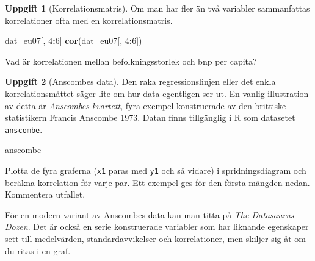 \documentclass[
]{book}
\newenvironment{Shaded}{\begin{snugshade}}{\end{snugshade}}
\newcommand{\DecValTok}[1]{\textcolor[rgb]{0.00,0.00,0.81}{#1}}
\newcommand{\FunctionTok}[1]{\textcolor[rgb]{0.13,0.29,0.53}{\textbf{#1}}}
\newcommand{\NormalTok}[1]{#1}
\newcommand{\SpecialCharTok}[1]{\textcolor[rgb]{0.81,0.36,0.00}{\textbf{#1}}}
\theoremstyle{definition}
\theoremstyle{definition}
\theoremstyle{definition}
\newtheorem{exercise}{Uppgift}[chapter]
\theoremstyle{definition}
\theoremstyle{remark}
\begin{document}
\begin{exercise}[Korrelationsmatris]
Om man har fler än två variabler sammanfattas korrelationer ofta med en korrelationsmatris.

\begin{Shaded}
\begin{Highlighting}[]
\NormalTok{dat\_eu07[, }\DecValTok{4}\SpecialCharTok{:}\DecValTok{6}\NormalTok{]}
\FunctionTok{cor}\NormalTok{(dat\_eu07[, }\DecValTok{4}\SpecialCharTok{:}\DecValTok{6}\NormalTok{])}
\end{Highlighting}
\end{Shaded}

Vad är korrelationen mellan befolkningsstorlek och bnp per capita?
\end{exercise}

\begin{exercise}[Anscombes data]

Den raka regressionslinjen eller det enkla korrelationsmåttet säger lite om hur data egentligen ser ut. En vanlig illustration av detta är \emph{Anscombes kvartett}, fyra exempel konstruerade av den brittiske statistikern Francis Anscombe 1973. Datan finns tillgänglig i R som datasetet \texttt{anscombe}.

\begin{Shaded}
\begin{Highlighting}[]
\NormalTok{anscombe}
\end{Highlighting}
\end{Shaded}

Plotta de fyra graferna (\texttt{x1} paras med \texttt{y1} och så vidare) i spridningsdiagram och beräkna korrelation för varje par. Ett exempel ges för den första mängden nedan. Kommentera utfallet.

\begin{Shaded}
\end{Shaded}

\end{exercise}

För en modern variant av Anscombes data kan man titta på \emph{The Datasaurus Dozen}. Det är också en serie konstruerade variabler som har liknande egenskaper sett till medelvärden, standardavvikelser och korrelationer, men skiljer sig åt om du ritas i en graf.
\end{document}
